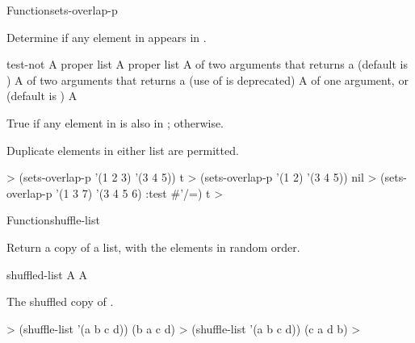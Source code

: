 \documentclass[10pt,twoside,english,pdftex]{article}
\begin{document}
\begin{functiondoc}{Function}{sets-overlap-p}{
     
    \returns{} }

\fnsyntax

\fnpurpose Determine if any element in  appears in 
.

\fnpackage {}

\fnmodule {}

\fnargs
\begin{args}{test-not}
\arg[list-1] A proper list
\arg[list-2] A proper list
\arg[test] A  of two arguments that returns a
 (default is ) 
 A  of two arguments that returns a
 (use of  is deprecated)
\arg[key] A  of one argument, or \nil{} (default is \nil)
\arg[boolean] A 
\end{args}

\fnreturns True if any element in  is also in
; \nil{} otherwise.

\fndescription Duplicate elements in either list are permitted.

\fnexamples
%
\W\supp
\begin{example}
  > (sets-overlap-p '(1 2 3) '(3 4 5))
  t
  > (sets-overlap-p '(1 2) '(3 4 5))
  nil
  > (sets-overlap-p '(1 3 7) '(3 4 5 6) :test #'/=)
  t
  >
\end{example}

\end{functiondoc}


\begin{functiondoc}{Function}{shuffle-list}{
  \returns{} }
%

\fnsyntax

\fnpurpose Return a copy of a list, with the elements in random order.

\fnpackage {}

\fnmodule {}

\fnargs
\begin{args}{shuffled-list}
\arg[list] A 
 A 
\end{args}

\fnreturns The shuffled copy of .

\fnexamples
%
\W\supp
\begin{example}
  > (shuffle-list '(a b c d))
  (b a c d)
  > (shuffle-list '(a b c d))
  (c a d b)
  >
\end{example}

\end{functiondoc}
\end{document}
